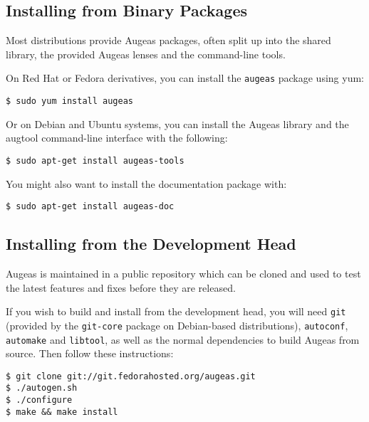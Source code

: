 \subsection{Installing from Binary Packages}


Most distributions provide Augeas packages, often split up into the shared library, the provided Augeas lenses and the command-line tools.

On Red Hat or Fedora derivatives, you can install the \verb!augeas! package using yum:

\begin{verbatim}
$ sudo yum install augeas
\end{verbatim}

Or on Debian and Ubuntu systems, you can install the Augeas library and the augtool command-line interface with the following:

\begin{verbatim}
$ sudo apt-get install augeas-tools
\end{verbatim}

You might also want to install the documentation package with:

\begin{verbatim}
$ sudo apt-get install augeas-doc
\end{verbatim}

\subsection{Installing from the Development Head}


Augeas is maintained in a public repository which can be cloned and used to test the latest features and fixes before they are released.

If you wish to build and install from the development head, you will need \verb!git! (provided by the \verb!git-core! package on Debian-based distributions), \verb!autoconf!, \verb!automake! and \verb!libtool!, as well as the normal dependencies to build Augeas from source. Then follow these instructions:

\begin{verbatim}
$ git clone git://git.fedorahosted.org/augeas.git
$ ./autogen.sh
$ ./configure
$ make && make install
\end{verbatim}
